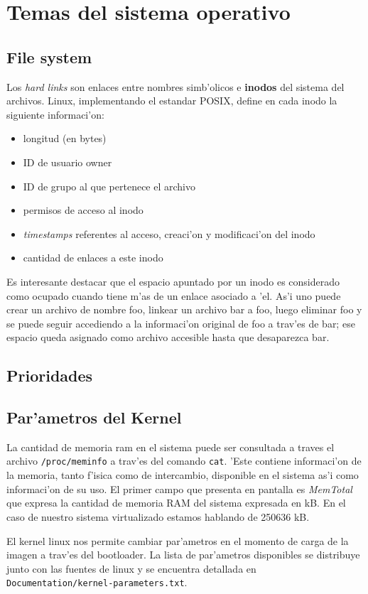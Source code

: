 \section{Temas del sistema operativo}
\subsection{File system}
Los \emph{hard links} son enlaces entre nombres simb'olicos e \textbf{inodos} del sistema del archivos. Linux, implementando el estandar POSIX, define en cada inodo la siguiente informaci'on:
\begin{itemize}
\item longitud (en bytes)
\item ID de usuario owner
\item ID de grupo al que pertenece el archivo
\item permisos de acceso al inodo
\item \emph{timestamps} referentes al acceso, creaci'on y modificaci'on del inodo
\item cantidad de enlaces a este inodo
\end{itemize}
Es interesante destacar que el espacio apuntado por un inodo es considerado como ocupado cuando tiene m'as de un enlace asociado a 'el. As'i uno puede crear un archivo de nombre foo, linkear un archivo bar a foo, luego eliminar foo y se puede seguir accediendo a la informaci'on original de foo a trav'es de bar; ese espacio queda asignado como archivo accesible hasta que desaparezca bar.
\subsection{Prioridades}
\subsection{Par'ametros del Kernel}
La cantidad de memoria ram en el sistema puede ser consultada a traves el archivo \texttt{/proc/meminfo} a trav'es del comando \texttt{cat}. 'Este contiene informaci'on de la memoria, tanto f'isica como de intercambio, disponible en el sistema as'i como informaci'on de su uso. El primer campo que presenta en pantalla es \emph{MemTotal} que expresa la cantidad de memoria RAM del sistema expresada en kB. En el caso de nuestro sistema virtualizado estamos hablando de 250636 kB.

El kernel linux nos permite cambiar par'ametros en el momento de carga de la imagen a trav'es del bootloader. La lista de par'ametros disponibles se distribuye junto con las fuentes de linux y se encuentra detallada en \texttt{Documentation/kernel-parameters.txt}.


